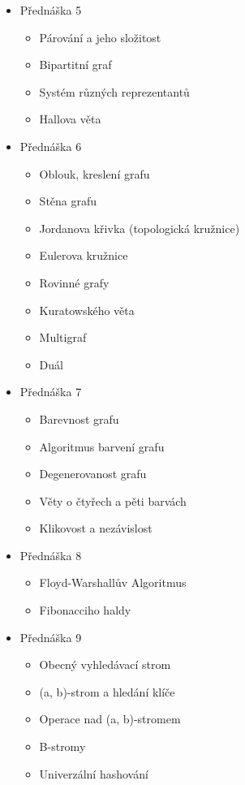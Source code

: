 \begin{itemize}
    \item Přednáška 5
    \begin{itemize}
        \item Párování a jeho složitost
        \item Bipartitní graf
        \item Systém různých reprezentantů
        \item Hallova věta
    \end{itemize}

    \item Přednáška 6
    \begin{itemize}
        \item Oblouk, kreslení grafu
        \item Stěna grafu
        \item Jordanova křivka (topologická kružnice)
        \item Eulerova kružnice
        \item Rovinné grafy
        \item Kuratowského věta
        \item Multigraf
        \item Duál
    \end{itemize}

    \item Přednáška 7
    \begin{itemize}
        \item Barevnost grafu
        \item Algoritmus barvení grafu
        \item Degenerovanost grafu
        \item Věty o čtyřech a pěti barvách
        \item Klikovost a nezávislost
    \end{itemize}

    \item Přednáška 8
    \begin{itemize}
        \item Floyd-Warshallův Algoritmus
        \item Fibonacciho haldy
    \end{itemize}

    \item Přednáška 9
    \begin{itemize}
        \item Obecný vyhledávací strom
        \item (a, b)-strom a hledání klíče
        \item Operace nad (a, b)-stromem
        \item B-stromy
        \item Univerzální hashování
    \end{itemize}


\end{itemize}
